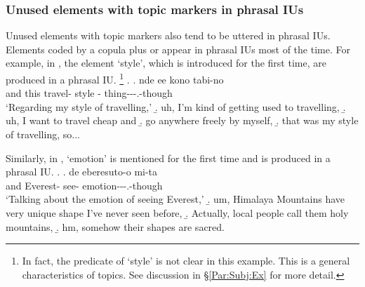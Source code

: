 \subsubsection{Unused elements with topic markers in phrasal IUs}\label{Int:Cor:InacTopic:PIU}

Unused elements with topic markers also tend to be uttered in
phrasal IUs.
Elements coded by a copula plus  or  appear
in phrasal IUs most of the time.
For example, in \Next[a],
the element  `style', which is introduced for the first time,
are produced in a phrasal IU.%
	\footnote{
	In fact, the predicate of `style' is not clear in this example.
	This is a general characteristics of topics.
	See discussion in \S \ref{Par:Subj:Ex} for more detail.
	}
%
\ex.
 \ag. nde {\iub} ee {\iub} kono {\iub} tabi-no {\iub}  {\iub}   {\iub} \\
      and {}  {} this {} travel- {} style {} - thing---.-though \\
      `Regarding my style of travelling,'
 \b. uh, I'm kind of getting used to travelling,
 \b. uh, I want to travel cheap and
 \b. go anywhere freely by myself,
 \b. that was my style of travelling, so...

Similarly,
in \Next[a],
 `emotion' is mentioned for the first time and
is produced in a phrasal IU.
%
\ex.
 \ag. de eberesuto-o mi-ta  {\iub} \\
      and Everest- see- emotion---.-though {} \\
      `Talking about the emotion of seeing Everest,'
 \b. um, Himalaya Mountains have very unique shape I've never seen before,
 \b. Actually, local people call them holy mountains,
 \b. hm, somehow their shapes are sacred.


